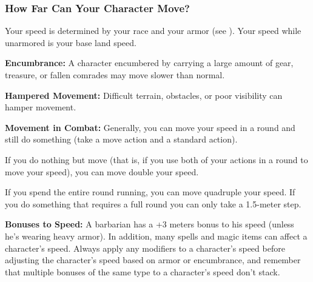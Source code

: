 \subsubsection{How Far Can Your Character Move?}
Your speed is determined by your race and your armor (see ). Your speed while unarmored is your base land speed.

\textbf{Encumbrance:} A character encumbered by carrying a large amount of gear, treasure, or fallen comrades may move slower than normal.

\textbf{Hampered Movement:} Difficult terrain, obstacles, or poor visibility can hamper movement.

\textbf{Movement in Combat:} Generally, you can move your speed in a round and still do something (take a move action and a standard action).

If you do nothing but move (that is, if you use both of your actions in a round to move your speed), you can move double your speed.

If you spend the entire round running, you can move quadruple your speed. If you do something that requires a full round you can only take a 1.5-meter step.

\textbf{Bonuses to Speed:} A barbarian has a +3 meters bonus to his speed (unless he's wearing heavy armor). In addition, many spells and magic items can affect a character's speed. Always apply any modifiers to a character's speed before adjusting the character's speed based on armor or encumbrance, and remember that multiple bonuses of the same type to a character's speed don't stack.

